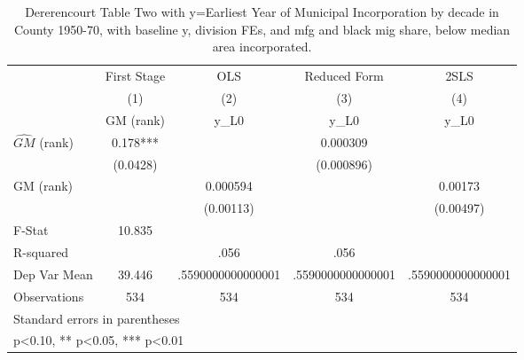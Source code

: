 \begin{table}[htbp]\centering
\def\sym#1{\ifmmode^{#1}\else\(^{#1}\)\fi}
\caption{Dererencourt Table Two with y=Earliest Year of Municipal Incorporation by decade in County 1950-70, with baseline y, division FEs, and mfg and black mig share, below median area incorporated.}
\begin{tabular}{l*{4}{c}}
\toprule
                    & First Stage   &         OLS   &Reduced Form   &        2SLS   \\
                    &\multicolumn{1}{c}{(1)}&\multicolumn{1}{c}{(2)}&\multicolumn{1}{c}{(3)}&\multicolumn{1}{c}{(4)}\\
                    &\multicolumn{1}{c}{GM  (rank)}&\multicolumn{1}{c}{y\_L0}&\multicolumn{1}{c}{y\_L0}&\multicolumn{1}{c}{y\_L0}\\
\midrule
$\hat{GM}$ (rank)   &       0.178***&               &    0.000309   &               \\
                    &    (0.0428)   &               &  (0.000896)   &               \\
\addlinespace
GM  (rank)          &               &    0.000594   &               &     0.00173   \\
                    &               &   (0.00113)   &               &   (0.00497)   \\
\midrule
F-Stat              &      10.835   &               &               &               \\
R-squared           &               &        .056   &        .056   &               \\
Dep Var Mean        &      39.446   &.5590000000000001   &.5590000000000001   &.5590000000000001   \\
Observations        &         534   &         534   &         534   &         534   \\
\bottomrule
\multicolumn{5}{l}{\footnotesize Standard errors in parentheses}\\
\multicolumn{5}{l}{\footnotesize * p<0.10, ** p<0.05, *** p<0.01}\\
\end{tabular}
\end{table}

